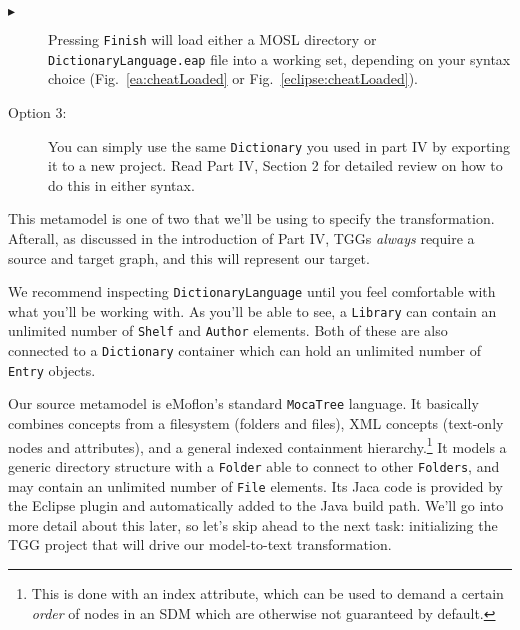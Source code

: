 \begin{description}
\item[$\blacktriangleright$] Pressing \texttt{Finish} will load either a MOSL directory or \texttt{DictionaryLanguage.eap} file into a working set, depending on
your syntax choice (Fig.~\ref{ea:cheatLoaded} or Fig.~\ref{eclipse:cheatLoaded}).

\begin{figure}[htbp]
   \centering
      \caption{}
\end{figure}


\clearpage
\item[Option 3:] You can simply use the same \texttt{Dictionary} you used in part IV by exporting it to a new project. Read Part IV, Section 2 for detailed
review on how to do this in either syntax.

\end{description} 

\vspace{0.5cm}

This metamodel is one of two that we'll be using to specify the transformation. Afterall, as discussed in the introduction of Part IV, TGGs \emph{always}
require a source and target graph, and this will represent our target. 

We recommend inspecting \texttt{DictionaryLanguage} until you feel comfortable with what you'll be working with. As you'll be able to see, a \texttt{Library}
can contain an unlimited number of \texttt{Shelf} and \texttt{Author} elements. Both of these are also connected to a \texttt{Dictionary} container which can
hold an unlimited number of \texttt{Entry} objects.

Our source metamodel is eMoflon's standard \texttt{MocaTree} language. It basically combines concepts from a filesystem (folders and files), XML concepts
(text-only nodes and attributes), and a general indexed containment hierarchy.\footnote{This is done with an index attribute, which can be used to demand a
certain \emph{order} of nodes in an SDM which are otherwise not guaranteed by default.} It models a generic directory structure with a \texttt{Folder} able to
connect to other \texttt{Folders}, and may contain an unlimited number of \texttt{File} elements. Its Jaca code is provided by the Eclipse plugin and
automatically added to the Java build path.  We'll go into more detail about this later, so let's skip ahead to the next task: initializing the TGG project that
will drive our model-to-text transformation.







